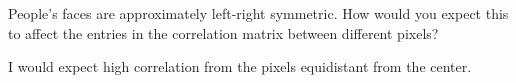 People’s faces are approximately left-right symmetric. How would you expect this to affect the entries in the correlation matrix between different pixels?

\begin{solution}
    I would expect high correlation from the pixels equidistant from the center.
\end{solution}
